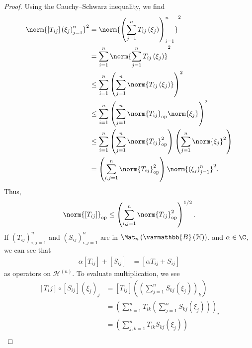 \documentclass[10pt]{mypackage}
\renewcommand*{\mathbb}[1]{\varmathbb{#1}}
\newcommand{\B}{\mathbb{B}}
\begin{document}
\begin{proof}
  Using the Cauchy--Schwarz inequality, we find
  \begin{align*}
    \norm{\left[T_{ij}\right]\left(\xi_j\right)_{j=1}^{n}}^2 &= \norm{\left(\sum_{j=1}^{n}T_{ij}\left(\xi_j\right)\right)_{i=1}^{n}}^2\\
                                                             &= \sum_{i=1}^{n}\norm{\sum_{j=1}^{n}T_{ij}\left(\xi_j\right)}^2\\
                                                             &\leq \sum_{i=1}^{n}\left(\sum_{j=1}^{n}\norm{T_{ij}\left(\xi_j\right)}\right)^2\\
                                                             &\leq \sum_{i=1}^{n}\left(\sum_{j=1}^{n}\norm{T_{ij}}_{\text{op}}\norm{\xi_j}\right)^2\\
                                                             &\leq \sum_{i=1}^{n}\left(\sum_{j=1}^{n}\norm{T_{ij}}_{\text{op}}^2\right)\left(\sum_{j=1}^{n}\norm{\xi_{j}}^2\right)\\
                                                             &= \left(\sum_{i,j=1}^{n}\norm{T_{ij}}_{\text{op}}^2\right)\norm{\left(\xi_j\right)_{j=1}^{n}}^2.
  \end{align*}
  Thus,
  \begin{align*}
    \norm{\left[T_{ij}\right]}_{\text{op}} \leq \left(\sum_{i,j=1}^{n}\norm{T_{ij}}_{\text{op}}^2\right)^{1/2}.
  \end{align*}
  If $\left(T_{ij}\right)_{i,j=1}^{n}$ and $\left(S_{ij}\right)_{i,j=1}^{n}$ are in $\Mat_{n}\left(\B\left(\mathcal{H}\right)\right)$, and $\alpha \in \C$, we can see that
  \begin{align*}
    \alpha \left[T_{ij}\right] + \left[S_{ij}\right] &= \left[\alpha T_{ij} + S_{ij}\right]
  \end{align*}
  as operators on $\mathcal{H}^{(n)}$. To evaluate multiplication, we see
  \begin{align*}
    \left[T_ij\right]\circ \left[S_{ij}\right]\left(\xi_{j}\right)_{j} &= \left[T_{ij}\right]\left(\left(\sum_{j=1}^{n}S_{kj}\left(\xi_j\right)\right)_{k}\right)\\
                                                                       &= \left(\sum_{k=1}^{n}T_{ik}\left(\sum_{j=1}^{n}S_{kj}\left(\xi_j\right)\right)\right)_i\\
                                                                       &= \left(\sum_{j,k=1}^{n}T_{ik}S_{kj}\left(\xi_j\right)\right)\\

\end{align*}
\end{proof}
\end{document}
